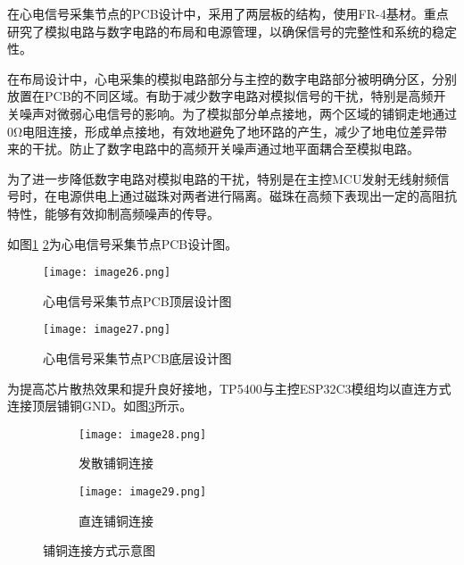 在心电信号采集节点的PCB设计中，采用了两层板的结构，使用FR-4基材。重点研究了模拟电路与数字电路的布局和电源管理，以确保信号的完整性和系统的稳定性。

在布局设计中，心电采集的模拟电路部分与主控的数字电路部分被明确分区，分别放置在PCB的不同区域。有助于减少数字电路对模拟信号的干扰，特别是高频开关噪声对微弱心电信号的影响。为了模拟部分单点接地，两个区域的铺铜走地通过0Ω电阻连接，形成单点接地，有效地避免了地环路的产生，减少了地电位差异带来的干扰。防止了数字电路中的高频开关噪声通过地平面耦合至模拟电路。

为了进一步降低数字电路对模拟电路的干扰，特别是在主控MCU发射无线射频信号时，在电源供电上通过磁珠对两者进行隔离。磁珠在高频下表现出一定的高阻抗特性，能够有效抑制高频噪声的传导。

如图\ref{F.ECG_image26} \ref{F.ECG_image27}为心电信号采集节点PCB设计图。

\begin{figure}[hbt]
    \centering
    \texttt{[image: image26.png]}
    \caption{心电信号采集节点PCB顶层设计图}
    \label{F.ECG_image26}
\end{figure}

\begin{figure}[hbt]
    \centering
    \texttt{[image: image27.png]}
    \caption{心电信号采集节点PCB底层设计图}
    \label{F.ECG_image27}
\end{figure}

为提高芯片散热效果和提升良好接地，TP5400与主控ESP32C3模组均以直连方式连接顶层铺铜GND。如图\ref{F.ECG_image28}所示。

\begin{figure}[!htb]
    \centering
    \begin{subfigure}[t]{0.24\linewidth}
        \begin{minipage}[b]{1\linewidth}
        \texttt{[image: image28.png]}
        \caption{发散铺铜连接}
        \end{minipage}
    \end{subfigure}
    \begin{subfigure}[t]{0.24\linewidth}
        \begin{minipage}[b]{1\linewidth}
        \texttt{[image: image29.png]}
        \caption{直连铺铜连接}
        \end{minipage}
    \end{subfigure}
    \caption{铺铜连接方式示意图}
    \label{F.ECG_image28}
\end{figure}


